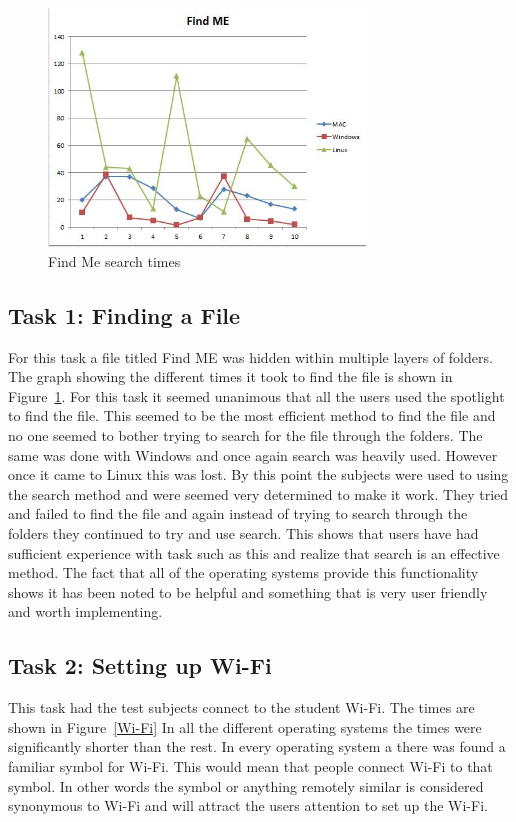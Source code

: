 \documentclass[11pt]{article}
\begin{document}
\begin{figure}[h!]
  \centering
    \includegraphics[width=0.75\textwidth]{./Images/Find_ME}
  \caption{Find Me search times}
 \label{Find}
\end{figure}

\subsection{Task 1: Finding a File}
For this task a file titled Find ME was hidden within multiple layers of folders. The graph showing the different times it took to find the file is shown in Figure~\ref{Find}. For this task it seemed unanimous that all the users used the spotlight to find the file. This seemed to be the most efficient method to find the file and no one seemed to bother trying to search for the file through the folders. The same was done with Windows and once again search was heavily used. However once it came to Linux this was lost. By this point the subjects were used to using the search method and were seemed very determined to make it work. They tried and failed to find the file and again instead of trying to search through the folders they continued to try and use search. This shows that users have had sufficient experience with task such as this and realize that search is an effective method. The fact that all of the operating systems provide this functionality shows it has been noted to be helpful and something that is very user friendly and worth implementing.

\subsection{Task 2: Setting up Wi-Fi}
This task had the test subjects connect to the student Wi-Fi. The times are shown in Figure~\ref{Wi-Fi} In all the different operating systems the times were significantly shorter than the rest. In every operating system a there was found a familiar symbol for Wi-Fi. This would mean that people connect Wi-Fi to that symbol. In other words the symbol or anything remotely similar is considered synonymous to Wi-Fi and will attract the users attention to set up the Wi-Fi.
\end{document}
